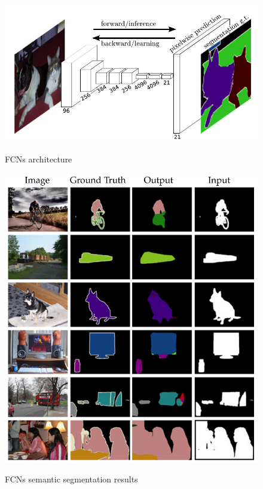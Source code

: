 \documentclass[]{IEEEtran}
\begin{document}
\begin{figure}[!hbt]
		\vspace{0.3cm}
		\begin{center}
			\includegraphics[width=\columnwidth]{fcn}
			\caption{FCNs architecture}
			\label{fig:fcn}
		    \hspace{0.5cm}
			\includegraphics[width=\columnwidth]{result}
			\caption{FCNs semantic segmentation results}
			\label{fig:result}
		\end{center}
	\end{figure}
\end{document}
